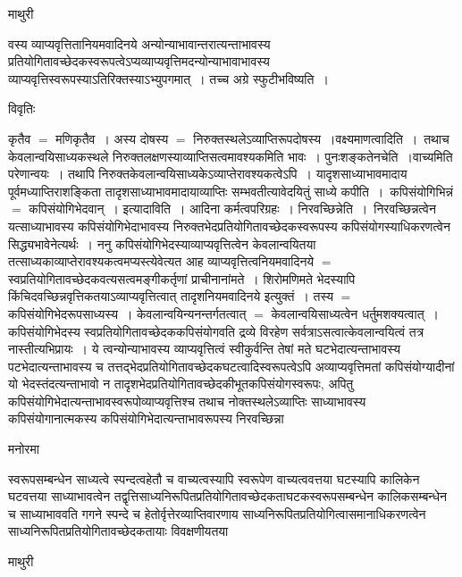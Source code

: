 \documentclass[10pt, openany]{book}
\begin{document}
{\begin{center}  माथुरी  \end{center}
{\la वस्य व्याप्यवृत्तितानियमवादिनये अन्योन्याभावान्तरात्यन्ताभावस्य प्रतियोगितावच्छेदकस्वरूपत्वेऽप्यव्याप्यवृत्तिमदन्योन्याभावाभावस्य व्याप्यवृत्तिस्वरूपस्याऽतिरिक्तस्याऽभ्युपगमात्~। तच्च अग्रे स्फुटीभविष्यति~।~}
  \begin{center}     विवृतिः \end{center}
कृतैव $=$ मणिकृतैव~। अस्य दोषस्य $=$ निरुक्तस्थलेऽव्याप्तिरूपदोषस्य~।{\la वक्ष्यमाणत्वादिति~}।~तथाच केवलान्वयिसाध्यकस्थले निरुक्तलक्षणस्याव्याप्तिसत्वमावश्यकमिति भावः~। पुनःशङ्कते{\qt नचेति~}।वाच्यमिति परेणान्वयः~। तथापि निरुक्तकेवलान्वयिसाध्यकेऽव्याप्तेरावश्यकत्वेऽपि~। यादृशसाध्याभावमादाय पूर्वमध्याप्तिराशङ्किता तादृशसाध्याभावमादायाव्याप्तिः सम्भवतीत्यावेदयितुं साध्ये
{\la कपीति~।}~कपिसंयोगिभिन्नं $=$  कपिसंयोगिभेदवान्~। इत्यादाविति~। आदिना कर्मत्वपरिग्रहः~। {\qt निरवच्छिन्नेति~}।~निरवच्छिन्नत्वेन यत्साध्याभावस्य
कपिसंयोगिभेदाभावस्य निरुक्तभेदप्रतियोगितावच्छेदकस्वरूपस्य कपिसंयोगस्याधिकरणत्वेन सिद्ध्यभावेनेत्यर्थः~। ननु कपिसंयोगिभेदस्याव्याप्यवृत्तित्वेन
केवलान्वयितया तत्साध्यकाव्याप्तेरावश्यकत्वमप्यस्त्येवेत्यत आह  व्याप्यवृत्तित्वनियमवादिनये $=$स्वप्रतियोगितावच्छेदकवत्यसत्वमङ्गीकर्तृणां प्राचीनानांमते~। शिरोमणिमते भेदस्यापि किंचिदवच्छिन्नवृत्तिकतयाऽव्याप्यवृत्तित्वात् तादृशनियमवादिनये इत्युक्तं~। तस्य $=$ कपिसंयोगिभेदरूपसाध्यस्य~।  केवलान्वयिन्यनन्तर्गतत्वात् $=$ केवलान्वयिसाध्यत्वेन धर्तुमशक्यत्वात्~। कपिसंयोगिभेदस्य स्वप्रतियोगितावच्छेदककपिसंयोगवति द्रव्ये विरहेण सर्वत्राऽसत्वात्केवलान्वयित्वं तत्र नास्तीत्यभिप्रायः~। ये त्वन्योन्याभावस्य व्याप्यवृत्तित्वं स्वीकुर्वन्ति तेषां मते घटभेदात्यन्ताभावस्य पटभेदात्यन्ताभावस्य च तत्तद्भेदप्रतियोगितावच्छेदकघटत्वादिस्वरूपत्वेऽपि अव्याप्यवृत्तिमतां कपिसंयोग्यादीनां यो भेदस्तंदत्यन्ताभावो न तादृशभेदप्रतियोगितावच्छेदकीभूतकपिसंयोगस्वरूपः, अपितु कपिसंयोगिभेदात्यन्ताभावस्वरूपोव्याप्यवृत्तिश्च तथाच नोक्तस्थलेऽव्याप्तिः साध्याभावस्य कपिसंयोगानात्मकस्य कपिसंयोगिभेदात्यन्ताभावरूपस्य निरवच्छिन्ना\textendash
\begin{center}   मनोरमा  \end{center}
स्वरूपसम्बन्धेन साध्यत्वे स्पन्दत्वहेतौ च वाच्यत्वस्यापि स्वरूपेण वाच्यत्ववत्तया घटस्यापि कालिकेन घटवत्तया साध्याभावत्वेन
तद्वृत्तिसाध्यनिरूपितप्रतियोगितावच्छेदकताघटकस्वरूपसम्बन्धेन कालिकसम्बन्धेन च साध्याभाववति गगने स्पन्दे च हेतोर्वृत्तेरव्याप्तिवारणाय साध्यनिरूपितप्रतियोगित्वासमानाधिकरणत्वेन साध्यनिरूपितप्रतियोगितावच्छेदकतायाः विवक्षणीयतया
\newpage
\begin{center}  माथुरी  \end{center}

}
\end{document}
